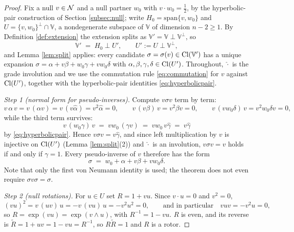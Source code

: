 \begin{proof}
Fix a null $v \in \mathcal{N}$ and a null partner $w_0$ with $v \cdot w_0 = \tfrac12$, by the hyperbolic-pair construction of Section \ref{subsec:null}; write $H_0 = \mathrm{span}\{v, w_0\}$ and $U = \{v, w_0\}^{\perp} \cap \mathbb{V}$, a nondegenerate subspace of $\mathbb{V}$ of dimension $n - 2 \geq 1$. By Definition \ref{def:extension} the extension splits as $\mathbb{V}' = \mathbb{V} \perp \mathbb{V}^{\perp}$, so
\[
\mathbb{V}' \;=\; H_0 \perp U', \qquad U' \mathrel{:=} U \perp \mathbb{V}^{\perp},
\]
and Lemma \ref{lem:split} applies: every candidate $\sigma = \sigma(v) \in \mathrm{Cl}(\mathbb{V}')$ has a unique expansion $\sigma = \alpha + v\beta + w_0\gamma + v w_0 \delta$ with $\alpha, \beta, \gamma, \delta \in \mathrm{Cl}(U')$. Throughout, $\hat{\cdot}$ is the grade involution and we use the commutation rule \eqref{eq:commutation} for $v$ against $\mathrm{Cl}(U')$, together with the hyperbolic-pair identities \eqref{eq:hyperbolicpair}.

\emph{Step 1 (normal form for pseudo-inverses).} Compute $v\sigma v$ term by term:
\[
v\,\alpha\, v = v\, (\alpha v) = v\,(v \hat{\alpha}) = v^2 \hat\alpha = 0, \qquad
v\,(v\beta)\,v = v^2 \beta v = 0, \qquad
v\,(v w_0 \delta)\,v = v^2 w_0 \delta v = 0,
\]
while the third term survives:
\[
v\,(w_0 \gamma)\,v \;=\; v w_0\,(\gamma v) \;=\; v w_0\, v \hat{\gamma} \;=\; v \hat{\gamma}
\]
by \eqref{eq:hyperbolicpair}. Hence $v \sigma v = v \hat{\gamma}$, and since left multiplication by $v$ is injective on $\mathrm{Cl}(U')$ (Lemma \ref{lem:split}(2)) and $\hat{\cdot}$ is an involution, $v \sigma v = v$ holds if and only if $\gamma = 1$. Every pseudo-inverse of $v$ therefore has the form
\[
\sigma \;=\; w_0 + \alpha + v\beta + v w_0 \delta .
\]
Note that only the first von Neumann identity is used; the theorem does not even require $\sigma v \sigma = \sigma$.

\emph{Step 2 (null rotations).} For $u \in U$ set $R = 1 + vu$. Since $v \cdot u = 0$ and $v^2 = 0$,
\[
(vu)^2 = v\,(uv)\,u = -v\,(vu)\,u = -v^2 u^2 = 0, \qquad \text{and in particular} \quad vuv = -v^2u = 0,
\]
so $R = \exp(vu) = \exp(v \wedge u)$, with $R^{-1} = 1 - vu$. $R$ is even, and its reverse is $\widetilde{R} = 1 + uv = 1 - vu = R^{-1}$, so $R \widetilde{R} = 1$ and $R$ is a rotor.


\end{proof}
